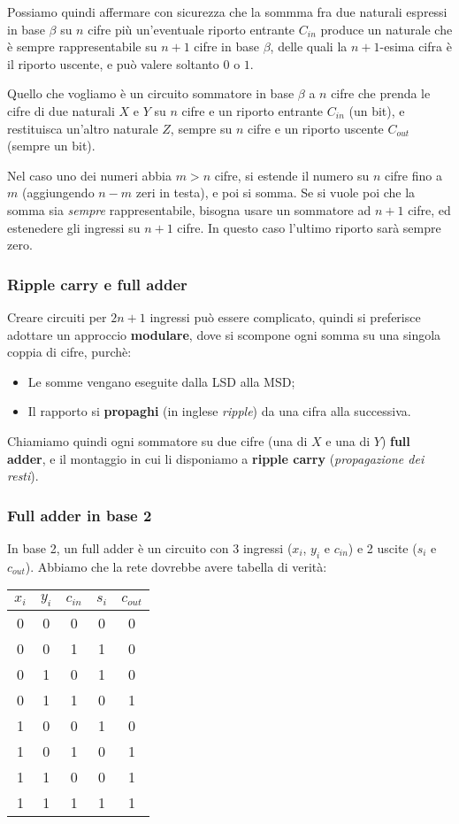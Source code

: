 \documentclass[a4paper,11pt]{article}
\begin{document}
\par\smallskip

Possiamo quindi affermare con sicurezza che la sommma fra due naturali espressi in base $\beta$ su $n$ cifre più un'eventuale riporto entrante $C_{in}$ produce un naturale che è sempre rappresentabile su $n+1$ cifre in base $\beta$, delle quali la $n+1$-esima cifra è il riporto uscente, e può valere soltanto $0$ o $1$.

Quello che vogliamo è un circuito sommatore in base $\beta$ a $n$ cifre che prenda le cifre di due naturali $X$ e $Y$ su $n$ cifre e un riporto entrante $C_{in}$ (un bit), e restituisca un'altro naturale $Z$, sempre su $n$ cifre e un riporto uscente $C_{out}$ (sempre un bit). 

Nel caso uno dei numeri abbia $m > n$ cifre, si estende il numero su $n$ cifre fino a $m$ (aggiungendo $n - m$ zeri in testa), e poi si somma.
Se si vuole poi che la somma sia \textit{sempre} rappresentabile, bisogna usare un sommatore ad $n+1$ cifre, ed estenedere gli ingressi su $n+1$ cifre.
In questo caso l'ultimo riporto sarà sempre zero.

\subsubsection{Ripple carry e full adder}
Creare circuiti per $2n + 1$ ingressi può essere complicato, quindi si preferisce adottare un approccio \textbf{modulare}, dove si scompone ogni somma su una singola coppia di cifre, purchè:
\begin{itemize}
	\item Le somme vengano eseguite dalla LSD alla MSD;
	\item Il rapporto si \textbf{propaghi} (in inglese \textit{ripple}) da una cifra alla successiva.
\end{itemize}
Chiamiamo quindi ogni sommatore su due cifre (una di $X$ e una di $Y$) \textbf{full adder}, e il montaggio in cui li disponiamo a \textbf{ripple carry} (\textit{propagazione dei resti}).

\subsubsection{Full adder in base 2}
In base 2, un full adder è un circuito con 3 ingressi ($x_i$, $y_i$ e $c_{in}$) e 2 uscite ($s_i$ e $c_{out}$).
Abbiamo che la rete dovrebbe avere tabella di verità:

\begin{table}[H]
	\center 
	\begin{tabular} { c  c  c | c  c }
		$x_i$ & $y_i$ & $c_{in}$ & $s_{i}$ & $c_{out}$ \\ 
		\hline
		0 & 0 & 0 & 0 & 0 \\ 
		0 & 0 & 1 & 1 & 0 \\ 
		0 & 1 & 0 & 1 & 0 \\ 
		0 & 1 & 1 & 0 & 1 \\ 
		1 & 0 & 0 & 1 & 0 \\ 
		1 & 0 & 1 & 0 & 1 \\ 
		1 & 1 & 0 & 0 & 1 \\ 
		1 & 1 & 1 & 1 & 1 
	\end{tabular}
\end{table}
\end{document}
